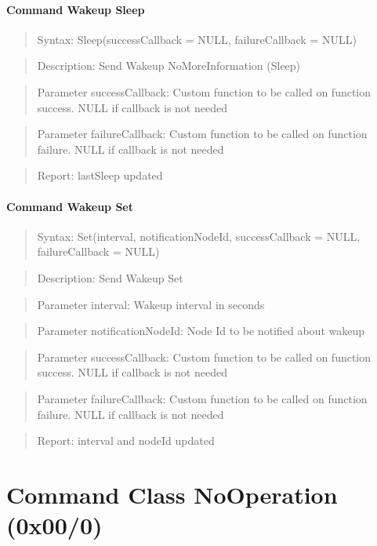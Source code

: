 \paragraph{Command Wakeup Sleep}
\begin{quote}Syntax: Sleep(successCallback = NULL, failureCallback = NULL)\end{quote}
\begin{quote}Description: Send Wakeup NoMoreInformation (Sleep)\end{quote}
\begin{quote}Parameter successCallback: Custom function to be called on function success. NULL if callback is not needed\end{quote}
\begin{quote}Parameter failureCallback: Custom function to be called on function failure. NULL if callback is not needed\end{quote}
\begin{quote}Report: lastSleep updated\end{quote}

\paragraph{Command Wakeup Set}
\begin{quote}Syntax: Set(interval, notificationNodeId, successCallback = NULL, failureCallback = NULL)\end{quote}
\begin{quote}Description: Send Wakeup Set\end{quote}
\begin{quote}Parameter interval: Wakeup interval in seconds\end{quote}
\begin{quote}Parameter notificationNodeId: Node Id to be notified about wakeup\end{quote}
\begin{quote}Parameter successCallback: Custom function to be called on function success. NULL if callback is not needed\end{quote}
\begin{quote}Parameter failureCallback: Custom function to be called on function failure. NULL if callback is not needed\end{quote}
\begin{quote}Report: interval and nodeId updated\end{quote}


\section{Command Class NoOperation (0x00/0)}

